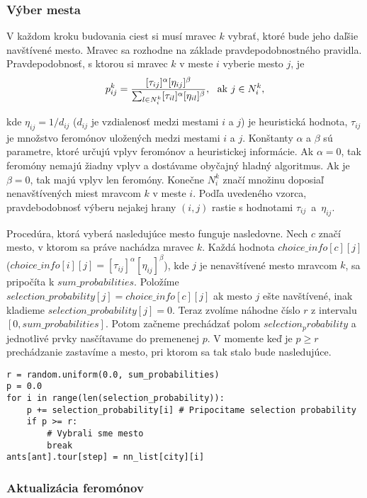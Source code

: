 \documentclass[12pt,a4paper]{article}
\begin{document}
\subsubsection*{Výber mesta}

V každom kroku budovania ciest si musí mravec $k$ vybrať, ktoré bude jeho daľšie navštívené mesto. Mravec sa rozhodne na
základe pravdepodobnostného pravidla. Pravdepodobnosť, s ktorou si mravec $k$ v meste $i$ vyberie mesto $j$, je
$$p_{ij}^k=\frac{[\tau_{ij}]^{\alpha}[\eta_{ij}]^{\beta}}{\sum_{l\in N_i^k}[\tau_{il}]^{\alpha}[\eta_{il}]^{\beta}},
\ \ {\rm ak}\ j\in N_i^k,$$

kde $\eta_{ij} = 1/d_{ij}$ ($d_{ij}$ je vzdialenosť medzi mestami $i$ a $j$) je heuristická hodnota, $\tau_{ij}$ je
množstvo feromónov uložených medzi mestami $i$ a $j$. Konštanty $\alpha$ a $\beta$ sú parametre, ktoré určujú vplyv
feromónov a heuristickej informácie. Ak $\alpha = 0$, tak feromóny nemajú žiadny vplyv a dostávame obyčajný hladný
algoritmus. Ak je $\beta = 0$, tak majú vplyv len feromóny. Konečne $N_i^k$ značí množinu doposiaľ nenavštívených miest mravcom $k$ v meste $i$.
Podľa uvedeného vzorca, pravdebodobnosť výberu nejakej hrany $(i,j)$ rastie s hodnotami $\tau_{ij}$~a~$\eta_{ij}$.

Procedúra, ktorá vyberá nasledujúce mesto funguje nasledovne. Nech $c$ značí mesto, v ktorom sa práve nachádza mravec
$k$. Každá hodnota $choice\_info[c][j]$ ($choice\_info[i][j] =
[\tau_{ij}]^{\alpha}[\eta_{ij}]^{\beta}$), kde $j$ je nenavštívené mesto mravcom $k$, sa pripočíta k
$sum\_probabilities$. Položíme $selection\_probability[j] = choice\_info[c][j]$ ak mesto $j$
ešte navštívené, inak kladieme $selection\_probability[j] = 0$. Teraz zvolíme náhodne číslo $r$ z intervalu\\
$[0,sum\_probabilities]$. Potom začneme prechádzať polom $selection_probability$ a jednotlivé prvky nasčítavame do
premenenej $p$. V momente keď je $p\ge r$ prechádzanie zastavíme a mesto, pri ktorom sa tak stalo bude nasledujúce.

\begin{verbatim}
r = random.uniform(0.0, sum_probabilities)
p = 0.0
for i in range(len(selection_probability)):
    p += selection_probability[i] # Pripocitame selection probability
    if p >= r:
        # Vybrali sme mesto
        break
ants[ant].tour[step] = nn_list[city][i]
\end{verbatim}

\subsubsection*{Aktualizácia feromónov}
\end{document}

